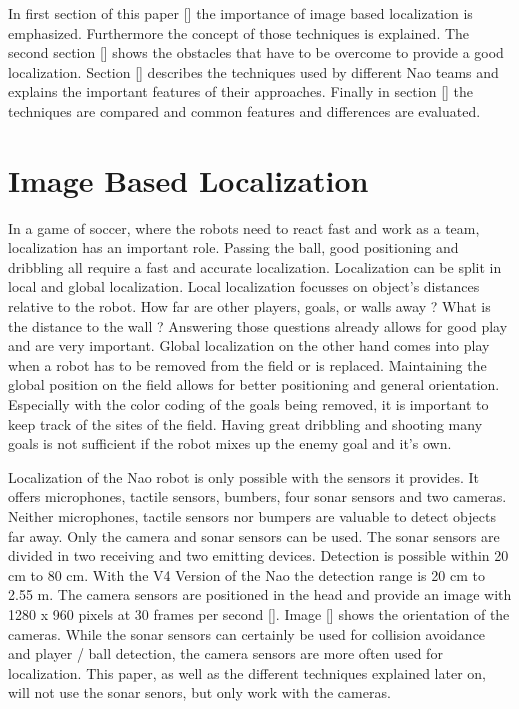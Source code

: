 \documentclass[12pt, a4paper]{scrartcl}
\begin{document}
  In first section of this paper [] the importance of image based localization is emphasized. Furthermore the concept of those techniques is explained. The second section [] shows the obstacles that have to be overcome to provide a good localization. Section [] describes the techniques used by different Nao teams and explains the important features of their approaches. Finally in section [] the techniques are compared and common features and differences are evaluated.

  \section{Image Based Localization}
  In a game of soccer, where the robots need to react fast and work as a team, localization has an important role. Passing the ball, good positioning and dribbling all require a fast and accurate localization. Localization can be split in local and global localization. Local localization focusses on object's distances relative to the robot. How far are other players, goals, or walls away ? What is the distance to the wall ? Answering those questions already allows for good play and are very important. Global localization on the other hand comes into play when a robot has to be removed from the field or is replaced. Maintaining the global position on the field allows for better positioning and general orientation. Especially with the color coding of the goals being removed, it is important to keep track of the sites of the field. Having great dribbling and shooting many goals is not sufficient if the robot mixes up the enemy goal and it's own.

  Localization of the Nao robot is only possible with the sensors it provides. It offers microphones, tactile sensors, bumbers, four sonar sensors and two cameras. Neither microphones, tactile sensors nor bumpers are valuable to detect objects far away. Only the camera and sonar sensors can be used. The sonar sensors are divided in two receiving and two emitting devices. Detection is possible within 20 cm to 80 cm. With the V4 Version of the Nao the detection range is 20 cm to 2.55 m. The camera sensors are positioned in the head and provide an image with 1280 x 960 pixels at 30 frames per second []. Image [] shows the orientation of the cameras. While the sonar sensors can certainly be used for collision avoidance and player / ball detection, the camera sensors are more often used for localization. This paper, as well as the different techniques explained later on, will not use the sonar senors, but only work with the cameras.
\end{document}
